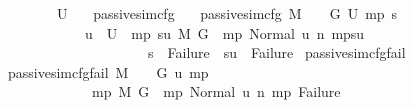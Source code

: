 \begin{isabellebody}
\ \ \ \ \ \ \ \ \ \ U{}\ {\isasymnoteq}\ {\isacharbraceleft}{\kern0pt}{\isacharbraceright}{\kern0pt}{\isacharparenright}{\kern0pt}{\isachardoublequoteclose}\isanewline
\isanewline
{}\isamarkupfalse%
\ passive{\isacharunderscore}{\kern0pt}sim{\isacharunderscore}{\kern0pt}cfg\isanewline
\ \ \ {\isachardoublequoteopen}passive{\isacharunderscore}{\kern0pt}sim{\isacharunderscore}{\kern0pt}cfg\ M\ {\isasymLambda}{\isacharprime}{\kern0pt}\ {\isasymGamma}\ {\isasymOmega}\ G\ U\ m{\isacharunderscore}{\kern0pt}p\ s{\isacharprime}{\kern0pt}\ {\isasymequiv}\ \isanewline
\ \ \ \ \ \ \ \ \ \ \ \ \ \ {\isacharparenleft}{\kern0pt}{\isasymforall}u\ {\isasymin}\ U{\isachardot}{\kern0pt}\ {\isasymexists}\ m{\isacharunderscore}{\kern0pt}p{\isacharprime}{\kern0pt}\ su{\isachardot}{\kern0pt}\ {\isacharparenleft}{\kern0pt}M{\isacharcomma}{\kern0pt}{\isasymLambda}{\isacharprime}{\kern0pt}{\isacharcomma}{\kern0pt}{\isasymGamma}{\isacharcomma}{\kern0pt}{\isasymOmega}{\isacharcomma}{\kern0pt}\ G\ {\isasymturnstile}\ {\isacharparenleft}{\kern0pt}m{\isacharunderscore}{\kern0pt}p{\isacharcomma}{\kern0pt}\ Normal\ u{\isacharparenright}{\kern0pt}\ {\isacharminus}{\kern0pt}n{\isasymrightarrow}{\isacharasterisk}{\kern0pt}\ {\isacharparenleft}{\kern0pt}m{\isacharunderscore}{\kern0pt}p{\isacharprime}{\kern0pt}{\isacharcomma}{\kern0pt}su{\isacharparenright}{\kern0pt}{\isacharparenright}{\kern0pt}\ {\isasymand}\ \isanewline
\ \ \ \ \ \ \ \ \ \ \ \ \ \ \ \ \ \ \ \ \ \ \ {\isacharparenleft}{\kern0pt}s{\isacharprime}{\kern0pt}\ {\isacharequal}{\kern0pt}\ Failure\ {\isasymlongrightarrow}\ su\ {\isacharequal}{\kern0pt}\ Failure{\isacharparenright}{\kern0pt}{\isacharparenright}{\kern0pt}{\isachardoublequoteclose}\isanewline
\isanewline
{}\isamarkupfalse%
\ passive{\isacharunderscore}{\kern0pt}sim{\isacharunderscore}{\kern0pt}cfg{\isacharunderscore}{\kern0pt}fail\isanewline
\ \ \ {\isachardoublequoteopen}passive{\isacharunderscore}{\kern0pt}sim{\isacharunderscore}{\kern0pt}cfg{\isacharunderscore}{\kern0pt}fail\ M\ {\isasymLambda}{\isacharprime}{\kern0pt}\ {\isasymGamma}\ {\isasymOmega}\ G\ u\ m{\isacharunderscore}{\kern0pt}p\ {\isasymequiv}\ \isanewline
\ \ \ \ \ \ \ \ \ \ \ \ \ \ {\isacharparenleft}{\kern0pt}{\isasymexists}\ m{\isacharunderscore}{\kern0pt}p{\isacharprime}{\kern0pt}{\isachardot}{\kern0pt}\ {\isacharparenleft}{\kern0pt}M{\isacharcomma}{\kern0pt}{\isasymLambda}{\isacharprime}{\kern0pt}{\isacharcomma}{\kern0pt}{\isasymGamma}{\isacharcomma}{\kern0pt}{\isasymOmega}{\isacharcomma}{\kern0pt}\ G\ {\isasymturnstile}\ {\isacharparenleft}{\kern0pt}m{\isacharunderscore}{\kern0pt}p{\isacharcomma}{\kern0pt}\ Normal\ u{\isacharparenright}{\kern0pt}\ {\isacharminus}{\kern0pt}n{\isasymrightarrow}{\isacharasterisk}{\kern0pt}\ {\isacharparenleft}{\kern0pt}m{\isacharunderscore}{\kern0pt}p{\isacharprime}{\kern0pt}{\isacharcomma}{\kern0pt}\ Failure{\isacharparenright}{\kern0pt}{\isacharparenright}{\kern0pt}{\isacharparenright}{\kern0pt}{\isachardoublequoteclose}\isanewline

\end{isabellebody}
